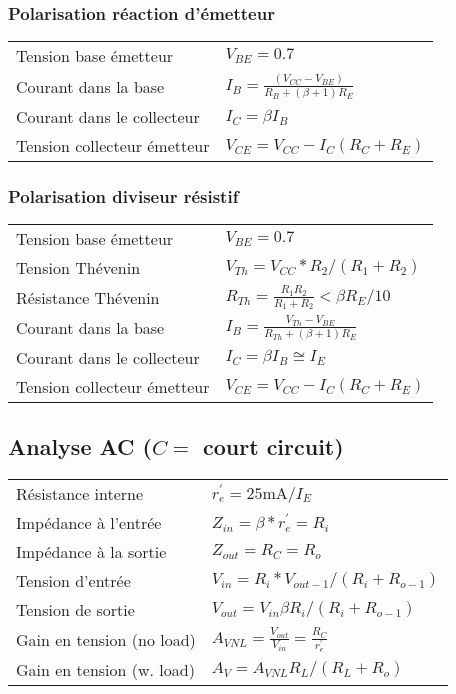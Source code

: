 \subsubsection{Polarisation réaction d'émetteur}
\begin{center}
    
\end{center}
\renewcommand{\arraystretch}{1.5}
\begin{tabular}{ll}
    Tension base émetteur & \(V_{BE}=0.7\) \\
    Courant dans la base & \(I_B=\frac{(V_{CC}-V_{BE})}{R_{B}+(\beta+1)R_E}\)\\
    Courant dans le collecteur & \(I_C=\beta I_B\)\\
    Tension collecteur émetteur & \(V_{CE}=V_{CC}-I_C(R_C+R_E)\)
\end{tabular}

\subsubsection{Polarisation diviseur résistif}
\begin{center}
    
\end{center}
\begin{tabular}{ll}
    Tension base émetteur & \(V_{BE}=0.7\)\\
    Tension Thévenin & \(V_{Th}=V_{CC}*R_{2}/(R_1+R_2)\) \\
    Résistance Thévenin & \(R_{Th}=\frac{R_1 R_2}{R_1+R_2} < \beta R_E/10\)\\
    Courant dans la base & \(I_B=\frac{V_{Th}-V_{BE}}{R_{Th}+(\beta+1) R_E }\)\\
    Courant dans le collecteur & \(I_C=\beta I_B \cong I_E\)\\
    Tension collecteur émetteur & \(V_{CE}=V_{CC}-I_C(R_C+R_E)\)
\end{tabular}

\subsection{Analyse AC ($C=$ court circuit)}
\begin{tabular}{ll}
    Résistance interne & \(r^{\prime}_e = 25\si{\milli\ampere}/I_E\) \\
    Impédance à l'entrée & \(Z_{in}=\beta*r^{\prime}_e = R_i\)\\
    Impédance à la sortie & \(Z_{out}=R_C = R_o\)\\
    Tension d'entrée & \(V_{in}=R_i*V_{out-1}/(R_i+R_{o-1})\)\\
    Tension de sortie & \(V_{out}=V_{in} \beta R_i/(R_i+R_{o-1})\)\\
    Gain en tension (no load) & \(A_{VNL}=\frac{V_{out}}{V_{in}}=\frac{R_C}{r^{\prime}_e}\)\\
    Gain en tension (w. load) & \(A_V = A_{VNL} R_L/(R_L+R_o)\)
\end{tabular}
